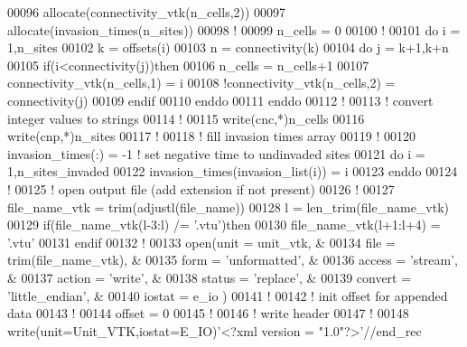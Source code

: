 \begin{DoxyCode}
00096 \textcolor{keyword}{allocate}(connectivity\_vtk(n\_cells,2))
00097 \textcolor{keyword}{allocate}(invasion\_times(n\_sites))
00098 \textcolor{comment}{!}
00099 n\_cells = 0
00100 \textcolor{comment}{!}
00101 \textcolor{keyword}{do} i = 1,n\_sites
00102    k = offsets(i)
00103    n = connectivity(k)
00104    \textcolor{keyword}{do} j = k+1,k+n
00105       \textcolor{keyword}{if}(i<connectivity(j))\textcolor{keyword}{then}
00106          n\_cells = n\_cells+1
00107          connectivity\_vtk(n\_cells,1) = i
00108          \textcolor{comment}{!connectivity\_vtk(n\_cells,2) = connectivity(j)}
00109       \textcolor{keyword}{endif}
00110    \textcolor{keyword}{enddo}
00111 \textcolor{keyword}{enddo}
00112 \textcolor{comment}{!}
00113 \textcolor{comment}{! convert integer values to strings}
00114 \textcolor{comment}{!}
00115 \textcolor{keyword}{write}(cnc,*)n\_cells
00116 \textcolor{keyword}{write}(cnp,*)n\_sites
00117 \textcolor{comment}{!}
00118 \textcolor{comment}{! fill invasion times array}
00119 \textcolor{comment}{!}
00120 invasion\_times(:) = -1 \textcolor{comment}{! set negative time to undinvaded sites}
00121 \textcolor{keyword}{do} i = 1,n\_sites\_invaded
00122    invasion\_times(invasion\_list(i)) = i
00123 \textcolor{keyword}{enddo}
00124 \textcolor{comment}{!}
00125 \textcolor{comment}{! open output file (add extension if not present)}
00126 \textcolor{comment}{!}
00127 file\_name\_vtk = trim(adjustl(file\_name))
00128 l = len\_trim(file\_name\_vtk)
00129 \textcolor{keyword}{if}(file\_name\_vtk(l-3:l) /= \textcolor{stringliteral}{'.vtu'})\textcolor{keyword}{then}
00130    file\_name\_vtk(l+1:l+4) = \textcolor{stringliteral}{'.vtu'}
00131 \textcolor{keyword}{endif}
00132 \textcolor{comment}{!}
00133 \textcolor{keyword}{open}(unit       = unit\_vtk,            &
00134      file       = trim(file\_name\_vtk), &
00135      form       = \textcolor{stringliteral}{'unformatted'},       &
00136      access     = \textcolor{stringliteral}{'stream'},            &
00137      action     = \textcolor{stringliteral}{'write'},             &
00138      status     = \textcolor{stringliteral}{'replace'},           &
00139      convert    = \textcolor{stringliteral}{'little\_endian'},     &
00140      iostat     = e\_io                 )
00141 \textcolor{comment}{!}
00142 \textcolor{comment}{! init offset for appended data}
00143 \textcolor{comment}{!}
00144 offset = 0
00145 \textcolor{comment}{!}
00146 \textcolor{comment}{! write header}
00147 \textcolor{comment}{!}
00148 \textcolor{keyword}{write}(unit=Unit\_VTK,iostat=E\_IO)\textcolor{stringliteral}{'<?xml version = "1.0"?>'}//end\_rec

\end{DoxyCode}
